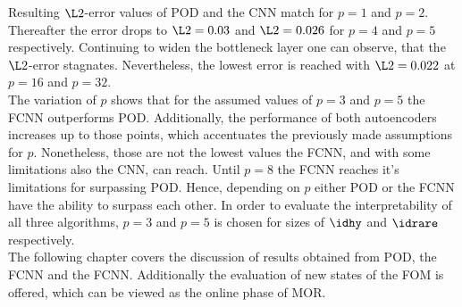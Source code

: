 Resulting \(\L2\)-error values of POD and the CNN match for \(p=1\) and \(p=2\). Thereafter the error drops to \(\L2=0.03\) and \(\L2=0.026\) for \(p=4\) and \(p=5\) respectively. Continuing to widen the bottleneck layer one can observe, that the \(\L2\)-error stagnates. Nevertheless, the lowest error is reached with \(\L2=0.022\) at \(p=16\) and \(p=32\).\\
The variation of \(p\) shows that for the assumed values of \(p=3\) and \(p=5\) the FCNN outperforms POD. Additionally, the performance of both autoencoders increases up to those points, which accentuates the previously made assumptions for \(p\). Nonetheless, those are not the lowest values the FCNN, and with some limitations also the CNN, can reach. Until \(p=8\) the FCNN reaches it's limitations for surpassing POD. Hence, depending on \(p\) either POD or the FCNN have the ability to surpass each other. In order to evaluate the interpretability of all three algorithms, \(p=3\) and \(p=5\) is chosen for sizes of \(\idhy\) and \(\idrare\) respectively.\\

The following chapter covers the discussion of results obtained from POD, the FCNN and the FCNN. Additionally the evaluation of new states of the FOM is offered, which can be viewed as the online phase of MOR. 
 